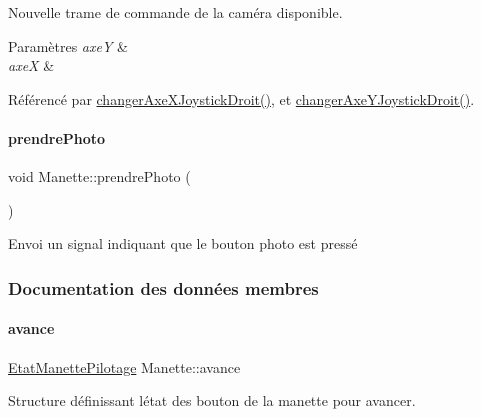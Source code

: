 Nouvelle trame de commande de la caméra disponible. 


\begin{DoxyParams}{Paramètres}
{\em axeY} & \\
\hline
{\em axeX} & \\
\hline
\end{DoxyParams}


Référencé par \hyperlink{manette_8cpp_source_l00455}{changer\+Axe\+X\+Joystick\+Droit()}, et \hyperlink{manette_8cpp_source_l00467}{changer\+Axe\+Y\+Joystick\+Droit()}.

\mbox{\label{class_manette_a34d2a8b73a0913ef361d64f60e5d0eac}} 
\paragraph{\texorpdfstring{prendre\+Photo}{prendrePhoto}}
{\footnotesize\ttfamily void Manette\+::prendre\+Photo (\begin{DoxyParamCaption}{ }\end{DoxyParamCaption})\hspace{0.3cm}{\ttfamily [signal]}}



Envoi un signal indiquant que le bouton photo est pressé 



\subsubsection{Documentation des données membres}
\mbox{\label{class_manette_a6ff181eab8c2206ca3d40bf5112e72ec}} 
\paragraph{\texorpdfstring{avance}{avance}}
{\footnotesize\ttfamily \hyperlink{struct_etat_manette_pilotage}{Etat\+Manette\+Pilotage} Manette\+::avance\hspace{0.3cm}{\ttfamily [private]}}



Structure définissant l\textquotesingle{}état des bouton de la manette pour avancer. 



